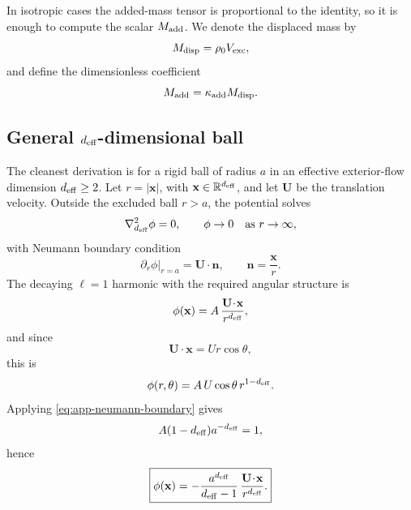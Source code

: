 \documentclass[11pt]{article}
\newcommand{\kadd}{\kappa_{\mathrm{add}}}
\begin{document}
In isotropic cases the added-mass tensor is proportional to the identity, so it is enough
to compute the scalar \(M_{\rm add}\). We denote the displaced mass by
\begin{equation}
M_{\rm disp}=\rho_0 V_{\rm exc},
\label{eq:app-displaced-mass}
\end{equation}
and define the dimensionless coefficient
\begin{equation}
M_{\rm add}=\kadd M_{\rm disp}.
\label{eq:app-kadd-def}
\end{equation}

\subsection{General \texorpdfstring{\(d_{\rm eff}\)}{d eff}-dimensional ball}
\label{app:added-mass-general-d}

The cleanest derivation is for a rigid ball of radius \(a\) in an effective exterior-flow
dimension \(d_{\rm eff}\ge 2\). Let \(r=|\mathbf x|\), with \(\mathbf x\in\mathbb R^{d_{\rm eff}}\),
and let \(\mathbf U\) be the translation velocity. Outside the excluded ball \(r>a\), the
potential solves
\begin{equation}
\nabla_{d_{\rm eff}}^2 \phi = 0,
\qquad
\phi\to 0 \quad \text{as } r\to\infty,
\label{eq:app-laplace-d}
\end{equation}
with Neumann boundary condition
\begin{equation}
\partial_r \phi\big|_{r=a}=\mathbf U\!\cdot\!\mathbf n,
\qquad
\mathbf n=\frac{\mathbf x}{r}.
\label{eq:app-neumann-boundary}
\end{equation}
The decaying \(\ell=1\) harmonic with the required angular structure is
\begin{equation}
\phi(\mathbf x)
=
A\,\frac{\mathbf U\!\cdot\!\mathbf x}{r^{d_{\rm eff}}},
\label{eq:app-harmonic-ansatz}
\end{equation}
and since
\begin{equation}
\mathbf U\!\cdot\!\mathbf x
=
Ur\cos\theta,
\end{equation}
this is
\begin{equation}
\phi(r,\theta)=A\,U\cos\theta\,r^{1-d_{\rm eff}}.
\end{equation}
Applying \eqref{eq:app-neumann-boundary} gives
\begin{equation}
A(1-d_{\rm eff})a^{-d_{\rm eff}}=1,
\end{equation}
hence
\begin{equation}
\boxed{
\phi(\mathbf x)
=
-\frac{a^{d_{\rm eff}}}{d_{\rm eff}-1}\,
\frac{\mathbf U\!\cdot\!\mathbf x}{r^{d_{\rm eff}}}.
}
\label{eq:app-general-potential}
\end{equation}
\end{document}
